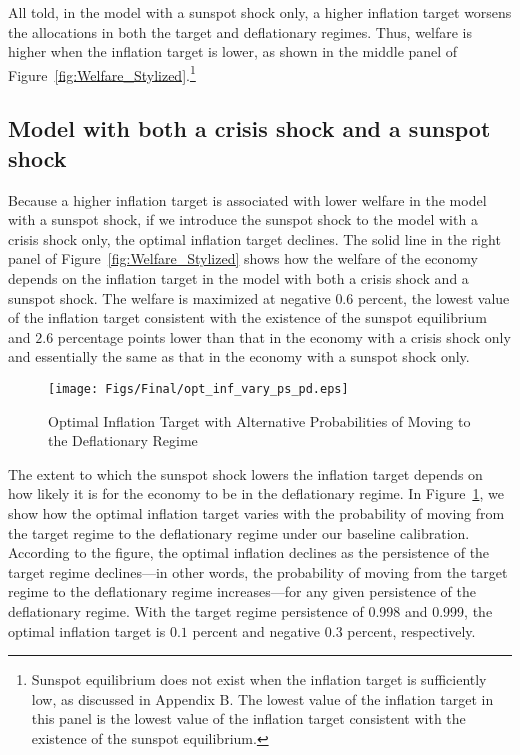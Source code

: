 \documentclass[11pt]{article}
\begin{document}
	All told, in the model with a sunspot shock only, a higher inflation target worsens the allocations in both the target and deflationary regimes. Thus, welfare is higher when the inflation target is lower, as shown in the middle panel of Figure~\ref{fig:Welfare_Stylized}.\footnote{Sunspot equilibrium does not exist when the inflation target is sufficiently low, as discussed in Appendix B. The lowest value of the inflation target in this panel is the lowest value of the inflation target consistent with the existence of the sunspot equilibrium.} 
	
	\subsection{Model with both a crisis shock and a sunspot shock}
	
	Because a higher inflation target is associated with lower welfare in the model with a sunspot shock, if we introduce the sunspot shock to the model with a crisis shock only, the optimal inflation target declines. The solid line in the right panel of Figure~\ref{fig:Welfare_Stylized} shows how the welfare of the economy depends on the inflation target in the model with both a crisis shock and a sunspot shock. The welfare is maximized at negative $0.6$ percent, the lowest value of the inflation target consistent with the existence of the sunspot equilibrium and $2.6$ percentage points lower than that in the economy with a crisis shock only and essentially the same as that in the economy with a sunspot shock only.
	
	\begin{figure}[!h]
		\begin{center}
			\caption{Optimal Inflation Target with Alternative Probabilities of Moving to the Deflationary Regime\label{fig:OptimalPiTarg_Stylized}}
			\texttt{[image: Figs/Final/opt\_inf\_vary\_ps\_pd.eps]}\\
		\end{center}
	\end{figure}
	
	The extent to which the sunspot shock lowers the inflation target depends on how likely it is for the economy to be in the deflationary regime. In Figure~\ref{fig:OptimalPiTarg_Stylized}, we show how the optimal inflation target varies with the probability of moving from the target regime to the deflationary regime under our baseline calibration. According to the figure, the optimal inflation declines as the persistence of the target regime declines---in other words, the probability of moving from the target regime to the deflationary regime increases---for any given persistence of the deflationary regime. With the target regime persistence of 0.998 and 0.999, the optimal inflation target is $0.1$ percent and negative $0.3$ percent, respectively. %
	
\end{document}
